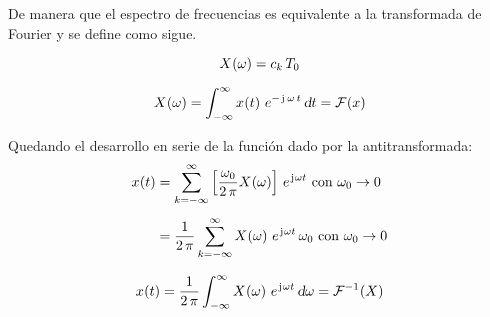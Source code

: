De manera que el espectro de frecuencias es equivalente a la transformada de Fourier y se define como sigue.

\begin{mdframed}[style=DefinitionFrame]
    \begin{defn}
    \end{defn}
    \begin{equation*}
        \fx[X]{\omega} = c_k \, T_0
    \end{equation*}
\end{mdframed}

\begin{mdframed}[style=DefinitionFrame]
    \begin{defn}
        \label{defn:FourierTrans}
    \end{defn}
    \begin{equation*}
        \fx[X]{\omega} = \int_{-\infty}^\infty \fx[x]{t} \, e^{-\iu \, \omega \, t} \, \dif t = \fourier{x}
    \end{equation*}
\end{mdframed}

Quedando el desarrollo en serie de la función dado por la antitransformada:
\begin{align*}
    \fx[x]{t} &= \sum_{\kth=-\infty}^\infty \left[ \frac{\omega_0}{2 \, \pi} \fx[X]{\omega} \right] \, \complexExp \text{ con } \omega_0 \to 0
    \\[1ex]
    &= \frac{1}{2 \, \pi} \sum_{\kth=-\infty}^\infty \fx[X]{\omega} \, \complexExp \, \omega_0 \text{ con } \omega_0 \to 0
\end{align*}

\begin{mdframed}[style=DefinitionFrame]
    \begin{defn}
        \label{defn:FourierTransInv}
    \end{defn}
    \begin{equation*}
        \fx[x]{t} = \frac{1}{2 \, \pi} \int_{-\infty}^\infty \fx[X]{\omega} \, \complexExp \, \dif \omega = \ffourier{X}
    \end{equation*}
\end{mdframed}